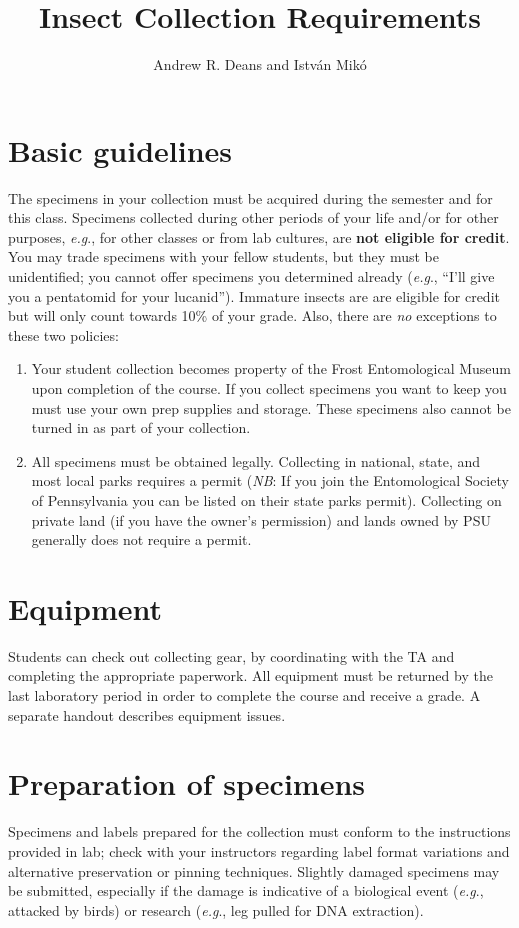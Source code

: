 \documentclass[letterpaper, 11pt]{article}
\title{Insect Collection Requirements}
\author{Andrew R. Deans and Istv\'an Mik\'o}
\begin{document}
\cleanlookdateon %
\maketitle
\thispagestyle{fancy}
\section*{Basic guidelines}
The specimens in your collection must be acquired during the semester and for this class. Specimens collected during other periods of your life and/or for other purposes, \textit{e.g}., for other classes or from lab cultures, are \textbf{not eligible for credit}. You may trade specimens with your fellow students, but they must be unidentified; you cannot offer specimens you determined already (\textit{e.g}., ``I'll give you a pentatomid for your lucanid''). Immature insects are are eligible for credit but will only count towards 10\% of your grade. Also, there are \textit{no} exceptions to these two policies: 

\begin{enumerate}
\item Your student collection becomes property of the Frost Entomological Museum upon completion of the course. If you collect specimens you want to keep you must use your own prep supplies and storage. These specimens also cannot be turned in as part of your collection.
\item All specimens must be obtained legally. Collecting in national, state, and most local parks requires a permit (\textit{NB}: If you join the Entomological Society of Pennsylvania you can be listed on their state parks permit). Collecting on private land (if you have the owner’s permission) and lands owned by PSU generally does not require a permit.%
\end{enumerate}

\section*{Equipment}
Students can check out collecting gear, by coordinating with the TA and completing the appropriate paperwork. All equipment must be returned by the last laboratory period in order to complete the course and receive a grade. A separate handout describes equipment issues.

\section*{Preparation of specimens}
Specimens and labels prepared for the collection must conform to the instructions provided in lab; check with your instructors regarding label format variations and alternative preservation or pinning techniques. Slightly damaged specimens may be submitted, especially if the damage is indicative of a biological event (\textit{e.g}., attacked by birds) or research (\textit{e.g}., leg pulled for DNA extraction).
\end{document}
